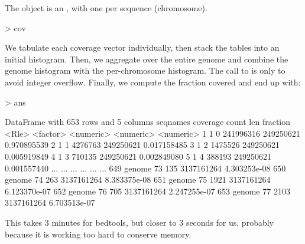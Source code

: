 \documentclass[10pt]{article}
\begin{document}
The  object is an , with one 
per sequence (chromosome). 
\begin{Schunk}
\begin{Sinput}
> cov
\end{Sinput}
\end{Schunk}

We tabulate each coverage vector individually, then stack the tables
into an initial histogram. Then, we aggregate over the entire genome
and combine the genome histogram with the per-chromosome
histogram. The call to  is only to avoid
integer overflow. Finally, we compute the fraction covered and end up
with:
\begin{Schunk}
\begin{Sinput}
> ans
\end{Sinput}
\begin{Soutput}
DataFrame with 653 rows and 5 columns
    seqnames coverage     count        len     fraction
       <Rle> <factor> <numeric>  <numeric>    <numeric>
1          1        0 241996316  249250621  0.970895539
2          1        1   4276763  249250621  0.017158485
3          1        2   1475526  249250621  0.005919849
4          1        3    710135  249250621  0.002849080
5          1        4    388193  249250621  0.001557440
...      ...      ...       ...        ...          ...
649   genome       73       135 3137161264 4.303253e-08
650   genome       74       263 3137161264 8.383375e-08
651   genome       75      1921 3137161264 6.123370e-07
652   genome       76       705 3137161264 2.247255e-07
653   genome       77      2103 3137161264 6.703513e-07
\end{Soutput}
\end{Schunk}
%
This takes 3 minutes for bedtools, but closer to 3 seconds for us, probably
because it is working too hard to conserve memory.
\end{document}
